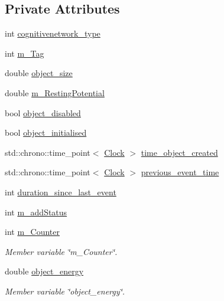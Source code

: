 \subsection*{Private Attributes}
\begin{DoxyCompactItemize}
\item 
int \mbox{\hyperlink{classCognitiveNetwork_a45bdf5b9f1ccc0ed1ad32e2a6b9e7dab}{cognitivenetwork\+\_\+type}}
\item 
int \mbox{\hyperlink{classCognitiveNetwork_ad6e12ec54ab456f6fad0ac33ee5836d3}{m\+\_\+\+Tag}}
\item 
double \mbox{\hyperlink{classCognitiveNetwork_a2d5ffaceb2676eeb45ed2879dc9be9ff}{object\+\_\+size}}
\item 
double \mbox{\hyperlink{classCognitiveNetwork_a79cf90e648303fbae25128053e1e74d2}{m\+\_\+\+Resting\+Potential}}
\item 
bool \mbox{\hyperlink{classCognitiveNetwork_a1bfe6f5f289e2fe876f3f7ccd459cbc6}{object\+\_\+disabled}}
\item 
bool \mbox{\hyperlink{classCognitiveNetwork_ae9c10ceb2a44c5458f93d4e66d02b245}{object\+\_\+initialised}}
\item 
std\+::chrono\+::time\+\_\+point$<$ \mbox{\hyperlink{universe_8h_a0ef8d951d1ca5ab3cfaf7ab4c7a6fd80}{Clock}} $>$ \mbox{\hyperlink{classCognitiveNetwork_a00751b9bc40bf22efd7a86a58478c760}{time\+\_\+object\+\_\+created}}
\item 
std\+::chrono\+::time\+\_\+point$<$ \mbox{\hyperlink{universe_8h_a0ef8d951d1ca5ab3cfaf7ab4c7a6fd80}{Clock}} $>$ \mbox{\hyperlink{classCognitiveNetwork_a8b20f9cf5c0857072278036c26541de5}{previous\+\_\+event\+\_\+time}}
\item 
int \mbox{\hyperlink{classCognitiveNetwork_a18e532233f30c3cd23a62d3a51361890}{duration\+\_\+since\+\_\+last\+\_\+event}}
\item 
int \mbox{\hyperlink{classCognitiveNetwork_afe2b8f2a9decc4aa34e349c4b31132ca}{m\+\_\+add\+Status}}
\item 
int \mbox{\hyperlink{classCognitiveNetwork_a97e0dfbeec1fda74336a6a01991252ad}{m\+\_\+\+Counter}}
\begin{DoxyCompactList}\small\item\em Member variable \char`\"{}m\+\_\+\+Counter\char`\"{}. \end{DoxyCompactList}\item 
double \mbox{\hyperlink{classCognitiveNetwork_a121f4a2db12d5fbaf8d7b4f38d2b8af5}{object\+\_\+energy}}
\begin{DoxyCompactList}\small\item\em Member variable \char`\"{}object\+\_\+energy\char`\"{}. \end{DoxyCompactList}\item 

\end{DoxyCompactItemize}
